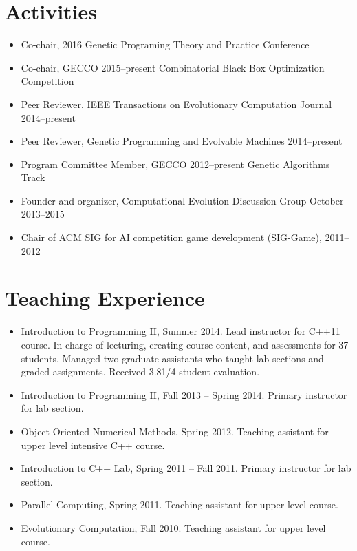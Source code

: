 \documentclass[a4paper,11pt]{article}
\begin{document}
\section{Activities}
\begin{itemize}
\item     Co-chair, 2016 Genetic Programing Theory and Practice Conference
\item     Co-chair, GECCO 2015--present Combinatorial Black Box Optimization Competition
\item     Peer Reviewer, IEEE Transactions on Evolutionary Computation Journal 2014--present
\item     Peer Reviewer, Genetic Programming and Evolvable Machines 2014--present
\item     Program Committee Member, GECCO 2012--present Genetic Algorithms Track
\item     Founder and organizer, Computational Evolution Discussion Group October 2013--2015
\item     Chair of ACM SIG for AI competition game development (SIG-Game), 2011--2012
\end{itemize}

\section{Teaching Experience}
\begin{itemize}
\item Introduction to Programming II, Summer 2014.
      Lead instructor for C++11 course. In charge of lecturing, creating course content, and assessments
      for 37 students. Managed two graduate assistants who taught lab sections and graded assignments.
      Received 3.81/4 student evaluation.
\item Introduction to Programming II, Fall 2013 -- Spring 2014. Primary instructor for lab section.
\item Object Oriented Numerical Methods, Spring 2012. Teaching assistant for upper level intensive C++ course.
\item Introduction to C++ Lab, Spring 2011 -- Fall 2011. Primary instructor for lab section.
\item Parallel Computing, Spring 2011. Teaching assistant for upper level course.
\item Evolutionary Computation, Fall 2010. Teaching assistant for upper level course.
\end{itemize}
\end{document}
